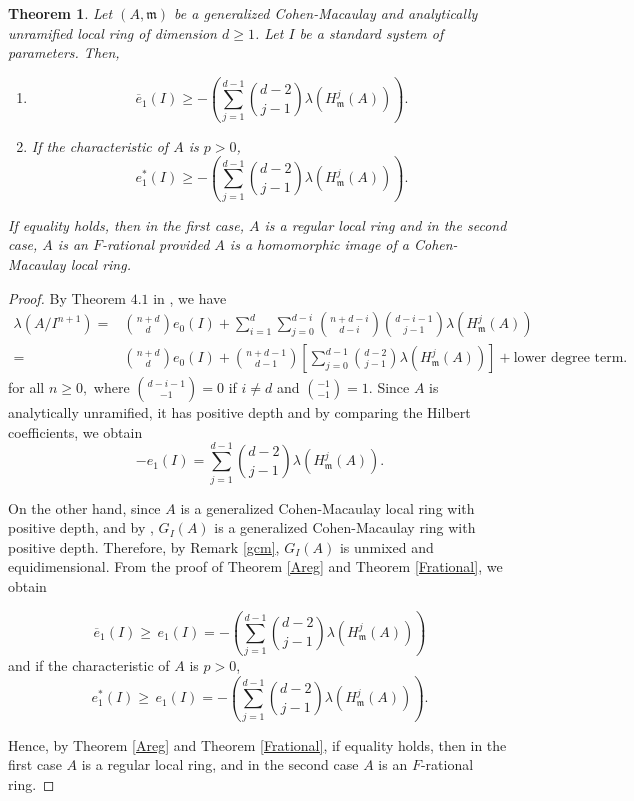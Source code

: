 \documentclass[11pt]{amsart}
\theoremstyle{plain}
\newtheorem{theorem}{Theorem}[section]
\newcommand{\m}{\mathfrak{m}}
\theoremstyle{plain}
\begin{document}
\begin{theorem}\label{gcm-main}
    Let $(A,\m)$ be a generalized Cohen-Macaulay and analytically unramified local ring of dimension $d\geq 1$. Let $I$ be a standard system of parameters. Then,
\begin{enumerate}
     \item $$\overline{e}_1({I}) \geq -\left(\sum_{j=1}^{d-1}\binom{d-2}{j-1}\lambda(H^j_{\m}(A))\right).$$
    \item If the characteristic of $A$ is $p>0$, $$e^*_1(I)\geq -\left(\sum_{j=1}^{d-1}\binom{d-2}{j-1}\lambda(H^j_{\m}(A))\right).$$

\end{enumerate}
   If equality holds, then in the first case, $A$ is a regular local ring and in the second case, $A$ is an $F$-rational provided $A$ is a homomorphic image of a Cohen-Macaulay local ring.
\end{theorem}
\begin{proof}
By Theorem $4.1$ in \cite{NVT}, we have
\begin{equation*}
    \begin{split}
        \lambda(A/I^{n+1})= & \binom{n+d}{d}e_0(I)+ \sum_{i=1}^{d}\sum_{j=0}^{d-i}\binom{n+d-i}{d-i}\binom{d-i-1}{j-1}\lambda(H^j_{\m}(A))\\ = & \binom{n+d}{d}e_0(I)+ \binom{n+d-1}{d-1}\left[ \sum_{j=0}^{d-1}\binom{d-2}{j-1}\lambda(H^j_{\m}(A)) \right]+ \text{lower degree term.}
    \end{split}
\end{equation*}
for all $n\geq 0,$ where $\binom{d-i-1}{-1}=0$ if $i\neq d$ and $\binom{-1}{-1}=1.$ Since $A$ is analytically unramified, it has positive depth and by comparing the Hilbert coefficients, we obtain $$-e_1(I)=\sum_{j=1}^{d-1}\binom{d-2}{j-1}\lambda(H^j_{\m}(A)).$$

   On the other hand, since $A$ is a generalized Cohen-Macaulay local ring with positive depth, and by \cite[Theorem 5.4]{NVT}, $G_I(A)$ is a generalized Cohen-Macaulay ring with positive depth. Therefore, by Remark \ref{gcm}, $G_I(A)$ is unmixed and equidimensional. From the proof of Theorem \ref{Areg} and Theorem \ref{Frational}, we obtain

$$\overline{e}_1({I}) \geq  \,  e_1(I)= -\left(\sum_{j=1}^{d-1}\binom{d-2}{j-1}\lambda(H^j_{\m}(A))\right)$$ and if the characteristic of $A$ is $p>0$, $$e^*_1(I)\geq  \, e_1(I)= -\left(\sum_{j=1}^{d-1}\binom{d-2}{j-1}\lambda(H^j_{\m}(A))\right).$$

    Hence, by Theorem \ref{Areg} and Theorem \ref{Frational},  if equality holds, then in the first case $A$ is a regular local ring, and in the second case $A$ is an $F$-rational ring.
\end{proof}
\end{document}

